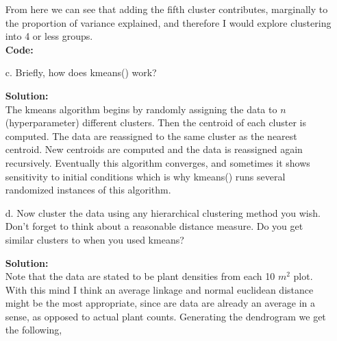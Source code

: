 \documentclass[12pt]{article}
\makeatletter
\theoremstyle{homework}
\newenvironment{exercise}[1]
{\def\@currentlabel{#1}\exercisecore}
{\endexercisecore}
\newcommand{\localhead}[1]{\par\smallskip\noindent\textbf{#1}\nobreak\\}%
\newcommand\solution{\localhead{Solution:}}
\makeatother
\begin{document}
\begin{exercise}{2}
\begin{enumerate}
\begin{figure}[H]
\begin{center}
      \end{center}
    \end{figure}
    From here we can see that adding the fifth cluster contributes, marginally to the proportion of variance explained, and therefore I would explore clustering into 4
    or less groups. \\
    \textbf{Code:}
    \begin{center}
    
    \end{center}
    \vspace{.15in}


    \item[c.] Briefly, how does kmeans() work?\\
    \solution The kmeans algorithm begins by randomly assigning the data to $n$(hyperparameter) different clusters. Then the centroid of each cluster is computed. 
    The data are reassigned to the same cluster as the nearest centroid. New centroids are computed and the data is reassigned again recursively. Eventually this algorithm 
    converges, and sometimes it shows sensitivity to initial conditions which is why kmeans() runs several randomized instances of this algorithm.
  \vspace{.15in}


  \item[d.] Now cluster the data using any hierarchical clustering method you wish. Don't forget to think about a reasonable distance measure. Do you get similar clusters to when you used kmeans?\\
  \solution Note that the data are stated to be plant densities from each 10 $m^2$ plot. With this mind I think an average linkage and normal
  euclidean distance might be the most appropriate, since are data are already an average in a sense, as opposed to actual plant counts. Generating the dendrogram we get the following, 
  

\end{enumerate}
\end{exercise}
\end{document}
